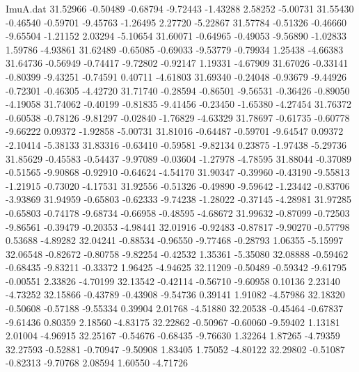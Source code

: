 \begin{filecontents}{ImuA.dat}
  31.52966   -0.50489   -0.68794   -9.72443   -1.43288    2.58252   -5.00731
  31.55430   -0.46540   -0.59701   -9.45763   -1.26495    2.27720   -5.22867
  31.57784   -0.51326   -0.46660   -9.65504   -1.21152    2.03294   -5.10654
  31.60071   -0.64965   -0.49053   -9.56890   -1.02833    1.59786   -4.93861
  31.62489   -0.65085   -0.69033   -9.53779   -0.79934    1.25438   -4.66383
  31.64736   -0.56949   -0.74417   -9.72802   -0.92147    1.19331   -4.67909
  31.67026   -0.33141   -0.80399   -9.43251   -0.74591    0.40711   -4.61803
  31.69340   -0.24048   -0.93679   -9.44926   -0.72301   -0.46305   -4.42720
  31.71740   -0.28594   -0.86501   -9.56531   -0.36426   -0.89050   -4.19058
  31.74062   -0.40199   -0.81835   -9.41456   -0.23450   -1.65380   -4.27454
  31.76372   -0.60538   -0.78126   -9.81297   -0.02840   -1.76829   -4.63329
  31.78697   -0.61735   -0.60778   -9.66222    0.09372   -1.92858   -5.00731
  31.81016   -0.64487   -0.59701   -9.64547    0.09372   -2.10414   -5.38133
  31.83316   -0.63410   -0.59581   -9.82134    0.23875   -1.97438   -5.29736
  31.85629   -0.45583   -0.54437   -9.97089   -0.03604   -1.27978   -4.78595
  31.88044   -0.37089   -0.51565   -9.90868   -0.92910   -0.64624   -4.54170
  31.90347   -0.39960   -0.43190   -9.55813   -1.21915   -0.73020   -4.17531
  31.92556   -0.51326   -0.49890   -9.59642   -1.23442   -0.83706   -3.93869
  31.94959   -0.65803   -0.62333   -9.74238   -1.28022   -0.37145   -4.28981
  31.97285   -0.65803   -0.74178   -9.68734   -0.66958   -0.48595   -4.68672
  31.99632   -0.87099   -0.72503   -9.86561   -0.39479   -0.20353   -4.98441
  32.01916   -0.92483   -0.87817   -9.90270   -0.57798    0.53688   -4.89282
  32.04241   -0.88534   -0.96550   -9.77468   -0.28793    1.06355   -5.15997
  32.06548   -0.82672   -0.80758   -9.82254   -0.42532    1.35361   -5.35080
  32.08888   -0.59462   -0.68435   -9.83211   -0.33372    1.96425   -4.94625
  32.11209   -0.50489   -0.59342   -9.61795   -0.00551    2.33826   -4.70199
  32.13542   -0.42114   -0.56710   -9.60958    0.10136    2.23140   -4.73252
  32.15866   -0.43789   -0.43908   -9.54736    0.39141    1.91082   -4.57986
  32.18320   -0.50608   -0.57188   -9.55334    0.39904    2.01768   -4.51880
  32.20538   -0.45464   -0.67837   -9.61436    0.80359    2.18560   -4.83175
  32.22862   -0.50967   -0.60060   -9.59402    1.13181    2.01004   -4.96915
  32.25167   -0.54676   -0.68435   -9.76630    1.32264    1.87265   -4.79359
  32.27593   -0.52881   -0.70947   -9.50908    1.83405    1.75052   -4.80122
  32.29802   -0.51087   -0.82313   -9.70768    2.08594    1.60550   -4.71726

\end{filecontents}

